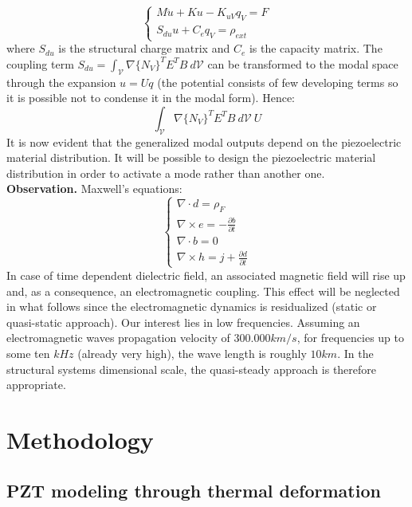 \documentclass[twocolumn,a4paper,10pt,english]{article}
\begin{document}
					\begin{equation}
						\begin{cases}
						M\ddot{u}+Ku-K_{uV}q_V=F \\
						S_{du}u+C_eq_V=\rho_{ext} 
						\end{cases}
					\end{equation}
					where $S_{du}$ is the structural charge matrix and $C_e$ is the capacity matrix.
					The coupling term $S_{du}=\int_{\mathcal{V}} \nabla\{N_V\}^T E^T B~d\mathcal{V}$ can be transformed to the modal space through the expansion $u=Uq$ (the potential consists of few developing terms so it is possible not to condense it in the modal form). Hence:
					\begin{equation}
						\int_{\mathcal{V}} \nabla\{N_V\}^T E^T B~d\mathcal{V}~U
					\end{equation}
					It is now evident that the generalized modal outputs depend on the piezoelectric material distribution. It will be possible to design the piezoelectric material distribution in order to activate a mode rather than another one.\\ 
					\medskip
					\textbf{Observation.} Maxwell's equations:
					\begin{equation}
					\begin{cases}
					\nabla \cdot d=\rho_F \\
					\nabla \times e = -\frac{\partial b}{\partial t}\\
					\nabla \cdot b=0 \\
					\nabla \times h = j+\frac{\partial d}{\partial t}
					\end{cases}
					\end{equation}
					In case of time dependent dielectric field, an associated magnetic field will rise up and, as a consequence, an electromagnetic coupling.
					This effect will be neglected in what follows since the electromagnetic dynamics is residualized (static or quasi-static approach). Our interest lies in low frequencies. Assuming an electromagnetic waves propagation velocity of $300.000 km/s$, for frequencies up to some ten $kHz$ (already very high), the wave length is roughly $10 km$. In the structural systems dimensional scale, the quasi-steady approach is therefore appropriate. 
\section{Methodology}
    
    \subsection{PZT modeling through thermal deformation}
    
\end{document}
